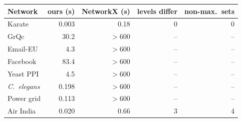 \setlength{\tabcolsep}{3pt}\footnotesize
\begin{tabular}{l r r r r}
\toprule
Network & ours (s) & NetworkX (s) & levels differ & non-max.\ sets\\
\midrule
Karate & 0.003 & 0.18 & 0 & 0\\
GrQc & 30.2 & $>$\num{600} & -- & --\\
Email-EU & 4.3 & $>$\num{600} & -- & --\\
Facebook & 83.4 & $>$\num{600} & -- & --\\
Yeast PPI & 4.5 & $>$\num{600} & -- & --\\
\emph{C.~elegans} & 0.198 & $>$\num{600} & -- & --\\
Power grid & 0.113 & $>$\num{600} & -- & --\\
Air India & 0.020 & 0.66 & 3 & 4\\
\bottomrule
\end{tabular}